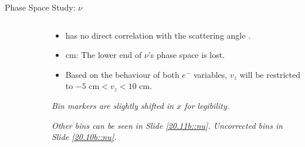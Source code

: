 \begin{frame}{Phase Space Study: $\nu$}
    \label{12.13::nu}

    \begin{columns}[onlytextwidth,T]

    \begin{column}{.48\linewidth}
        \vspace{-15pt}
        \begin{center}
            \begin{figure}[t]
            \end{figure}
        \end{center}
    \end{column}

    \begin{column}{.50\linewidth}
        \begin{itemize}
            \item
                \ef{$\nu$} has no direct correlation with the scattering angle .

            \vspace{12pt}
            \item
                 \textcolor{efd_green}{cm}: The lower end of $\nu$'s phase space is lost.

            \vspace{12pt}
            \item
                Based on the behaviour of both $e^-$ variables, $v_z$ will be restricted to \textcolor{efd_green}{$-5 \text{ cm} < v_z < 10 \text{ cm}$}.
        \end{itemize}

        \vspace{66pt}

        \begin{flushright}
            \tiny{\textit{Bin markers are slightly shifted in $x$ for legibility.}}

            \tiny{\textit{
                Other bins can be seen in Slide \textcolor{efd_purple}{\ref{20.11b::nu}}.
                Uncorrected bins in Slide \textcolor{efd_purple}{\ref{20.10b::nu}}.
            }}
        \end{flushright}
    \end{column}

    \end{columns}
\end{frame}

